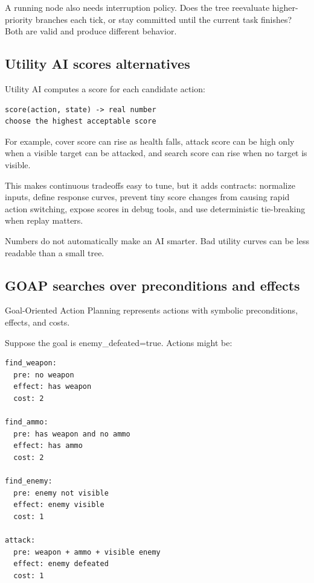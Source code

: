 A running node also needs interruption policy. Does the tree reevaluate higher-priority branches each tick, or stay committed until the current task finishes? Both are valid and produce different behavior.

\subsection{Utility AI scores alternatives}\label{06-engine-ii-ch047-utility-ai-scores-alternatives}

\hypertarget{06-engine-ii-ch047-utility-ai-scores-alternatives}{}

Utility AI computes a score for each candidate action:

\begin{verbatim}
score(action, state) -> real number
choose the highest acceptable score
\end{verbatim}

For example, cover score can rise as health falls, attack score can be high only when a visible target can be attacked, and search score can rise when no target is visible.

This makes continuous tradeoffs easy to tune, but it adds contracts: normalize inputs, define response curves, prevent tiny score changes from causing rapid action switching, expose scores in debug tools, and use deterministic tie-breaking when replay matters.

Numbers do not automatically make an AI smarter. Bad utility curves can be less readable than a small tree.

\subsection{GOAP searches over preconditions and effects}\label{06-engine-ii-ch047-goap-searches-over-preconditions-and-effects}

\hypertarget{06-engine-ii-ch047-goap-searches-over-preconditions-and-effects}{}

Goal-Oriented Action Planning represents actions with symbolic preconditions, effects, and costs.

Suppose the goal is enemy\_defeated=true. Actions might be:

\begin{verbatim}
find_weapon:
  pre: no weapon
  effect: has weapon
  cost: 2

find_ammo:
  pre: has weapon and no ammo
  effect: has ammo
  cost: 2

find_enemy:
  pre: enemy not visible
  effect: enemy visible
  cost: 1

attack:
  pre: weapon + ammo + visible enemy
  effect: enemy defeated
  cost: 1
\end{verbatim}

